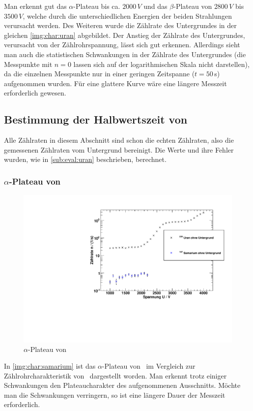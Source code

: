 Man erkennt gut das $\alpha$-Plateau bis ca. $2000\,V$ und das $\beta$-Plateau von $2800\,V$ bis $3500\,V$, welche durch die 
unterschiedlichen Energien der beiden Strahlungen verursacht werden. Des Weiteren wurde die Zählrate des Untergrundes in der gleichen 
\autoref{img:char:uran} abgebildet. Der Anstieg der Zählrate des Untergrundes, verursacht von der Zählrohrspannung, lässt sich gut erkennen. Allerdings 
sieht man auch die statistischen Schwankungen in der Zählrate des Untergrundes (die Messpunkte mit $n = 0 $ lassen sich auf der logarithmischen 
Skala nicht darstellen), da die einzelnen Messpunkte nur in einer geringen Zeitspanne ($t=50\,$s) aufgenommen wurden. Für eine glattere Kurve wäre 
eine längere Messzeit erforderlich gewesen.
\subsection{Bestimmung der Halbwertszeit von \samarium}
Alle Zählraten in diesem Abschnitt sind schon die echten Zählraten, also die gemessenen Zählraten vom Untergrund bereinigt. 
Die Werte und ihre Fehler wurden, wie in \ref{sub:eval:uran} beschrieben, berechnet.
\subsubsection{$\alpha$-Plateau von \samarium}
\begin{figure}[H]
\begin{center}
  \includegraphics[width=15cm]{../img/Samarium147_Charakteristik.pdf}
  \caption[$\alpha$-Plateau mit \samarium]{$\alpha$-Plateau von \samarium}
  \label{img:char:samarium}
\end{center}
\end{figure}
In \autoref{img:char:samarium} ist das $\alpha$-Plateau von \samarium\, im Vergleich zur Zählrohrcharakteristik von \uran\, dargestellt worden. 
Man erkennt trotz einiger Schwankungen den Plateaucharakter des aufgenommenen Ausschnitts. Möchte man die Schwankungen verringern, so ist eine 
längere Dauer der Messzeit erforderlich.

